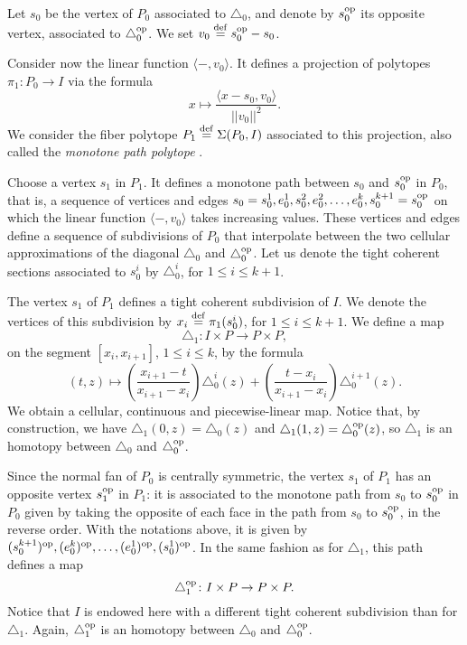 Let $s_0$ be the vertex of $P_0$ associated to $\triangle_0$, and denote by $s_0^{\mathrm{op}}$ its opposite vertex, associated to $\triangle_0^{\mathrm{op}}$. We set $v_0 \stackrel{\mathrm{def}}{=} s_0^{\mathrm{op}}-s_0$. 

Consider now the linear function $\langle - , v_0 \rangle$.
It defines a projection of polytopes $\pi_1 \colon P_0 \to I$ via the formula
\[
x \mapsto \frac{\langle x-s_0, v_0 \rangle}{||v_0||^2}.
\]
We consider the fiber polytope $P_1 \stackrel{\mathrm{def}}{=} \Sigma(P_0,I)$ associated to this projection, also called the \emph{monotone path polytope} \cite[Chapter 9]{Ziegler95}.

Choose a vertex $s_1$ in $P_1$.
It defines a monotone path between $s_0$ and $s^{\mathrm{op}}_0$ in $P_0$, that is, a sequence of vertices and edges $s_0 = s_0^1, e_0^1, s_0^2, e_0^2, \dots, e_0^k, s_0^{k+1} = s^{\mathrm{op}}_0$ on which the linear function $\langle - , v_0 \rangle$ takes increasing values.
These vertices and edges define a sequence of subdivisions of $P_0$ that interpolate between the two cellular approximations of the diagonal $\triangle_0$ and $\triangle^{\mathrm{op}}_0$.
Let us denote the tight coherent sections associated to $s_0^i$ by $\triangle_0^i$, for $1 \leq i \leq k+1$.

The vertex $s_1$ of $P_1$ defines a tight coherent subdivision of $I$.
We denote the vertices of this subdivision by $x_i \stackrel{\mathrm{def}}{=} \pi_1(s_0^i)$, for $1 \leq i \leq k+1$.
We define a map
\[
\triangle_1 \colon I \times P \to P \times P,
\]
on the segment $[x_i, x_{i+1}]$, $1 \leq i \leq k$, by the formula
\[
(t,z) \mapsto \left( \frac{x_{i+1}-t}{x_{i+1}-x_i} \right) \triangle_0^{i}(z) + \left( \frac{t-x_{i}}{x_{i+1}-x_i} \right) \triangle_0^{i+1}(z).
\]
We obtain a cellular, continuous and piecewise-linear map.
Notice that, by construction, we have $\triangle_1(0,z)=\triangle_0(z)$ and $\triangle_1(1,z)=\triangle_0^{\mathrm{op}}(z)$, so $\triangle_1$ is an homotopy between $\triangle_0$ and $\triangle_0^{\mathrm{op}}$.

Since the normal fan of $P_0$ is centrally symmetric, the vertex $s_1$ of $P_1$ has an opposite vertex $s_1^{\mathrm{op}}$ in $P_1$: it is associated to the monotone path from $s_0$ to $s_0^{\mathrm{op}}$ in $P_0$ given by taking the opposite of each face in the path from $s_0$ to $s^{\mathrm{op}}_0$, in the reverse order.
With the notations above, it is given by $(s_0^{k+1})^{\mathrm{op}},(e_0^k)^{\mathrm{op}},\ldots,(e_0^1)^{\mathrm{op}},(s_0^1)^{\mathrm{op}}$.
In the same fashion as for $\triangle_1$, this path defines a map
\[
\triangle_1^{\mathrm{op}} \colon I \times P \to P \times P.
\]
Notice that $I$ is endowed here with a different tight coherent subdivision than for $\triangle_1$.
Again, $\triangle_1^{\mathrm{op}}$ is an homotopy between $\triangle_0$ and $\triangle_0^{\mathrm{op}}$.

